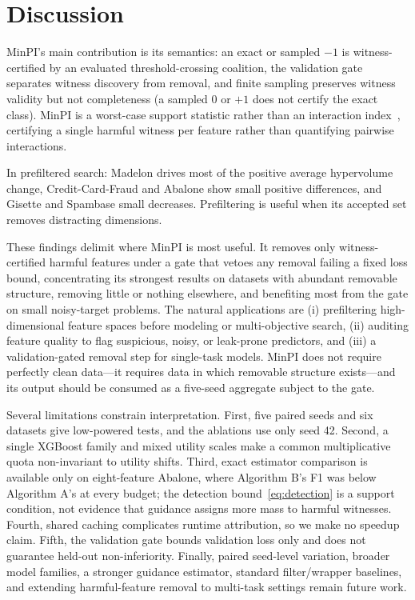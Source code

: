 \documentclass{article}
\begin{document}
\FloatBarrier

\section{Discussion}
\label{sec:discussion}

MinPI's main contribution is its semantics: an exact or sampled $-1$ is witness-certified by an evaluated threshold-crossing coalition, the validation gate separates witness discovery from removal, and finite sampling preserves witness validity but not completeness (a sampled 0 or $+1$ does not certify the exact class). MinPI is a worst-case support statistic rather than an interaction index~\citep{grabisch1999axiomatic,rabitti2019shapley}, certifying a single harmful witness per feature rather than quantifying pairwise interactions.

In prefiltered search: Madelon drives most of the positive average hypervolume change, Credit-Card-Fraud and Abalone show small positive differences, and Gisette and Spambase small decreases. Prefiltering is useful when its accepted set removes distracting dimensions.

These findings delimit where MinPI is most useful. It removes only witness-certified harmful features under a gate that vetoes any removal failing a fixed loss bound, concentrating its strongest results on datasets with abundant removable structure, removing little or nothing elsewhere, and benefiting most from the gate on small noisy-target problems. The natural applications are (i) prefiltering high-dimensional feature spaces before modeling or multi-objective search, (ii) auditing feature quality to flag suspicious, noisy, or leak-prone predictors, and (iii) a validation-gated removal step for single-task models. MinPI does not require perfectly clean data---it requires data in which removable structure exists---and its output should be consumed as a five-seed aggregate subject to the gate.

Several limitations constrain interpretation. First, five paired seeds and six datasets give low-powered tests, and the ablations use only seed 42. Second, a single XGBoost family and mixed utility scales make a common multiplicative quota non-invariant to utility shifts. Third, exact estimator comparison is available only on eight-feature Abalone, where Algorithm B's F1 was below Algorithm A's at every budget; the detection bound~\eqref{eq:detection} is a support condition, not evidence that guidance assigns more mass to harmful witnesses. Fourth, shared caching complicates runtime attribution, so we make no speedup claim. Fifth, the validation gate bounds validation loss only and does not guarantee held-out non-inferiority. Finally, paired seed-level variation, broader model families, a stronger guidance estimator, standard filter/wrapper baselines, and extending harmful-feature removal to multi-task settings remain future work.
\end{document}
